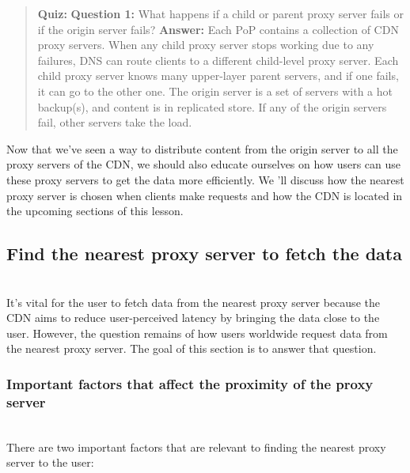 \begin{quote}
\textbf{Quiz:}
\textbf{Question 1:} What happens if a child or parent proxy server fails or if the origin server fails?
\textbf{Answer:} Each PoP contains a collection of CDN proxy servers. When any child proxy server stops working due to any failures, DNS can route clients to a different child-level proxy server. Each child proxy server knows many upper-layer parent servers, and if one fails, it can go to the other one. The origin server is a set of servers with a hot backup(s), and content is in replicated store. If any of the origin servers fail, other servers take the load.
\end{quote}

Now that we've seen a way to distribute content from the origin server to all the proxy servers of the CDN, we should also educate ourselves on how users can use these proxy servers to get the data more efficiently. We 'll discuss how the nearest proxy server is chosen when clients make requests and how the CDN is located in the upcoming sections of this lesson.

\subsection{Find the nearest proxy server to fetch the data}\label{Bn1An9fsycXkC0z0epKje}
\\
It's vital for the user to fetch data from the nearest proxy server because the CDN aims to reduce user-perceived latency by bringing the data close to the user. However, the question remains of how users worldwide request data from the nearest proxy server. The goal of this section is to answer that question.

\subsubsection{Important factors that affect the proximity of the proxy server}\label{ROqNo_dtSkuSYaXNnwlaQ}
\\
There are two important factors that are relevant to finding the nearest proxy server to the user:

